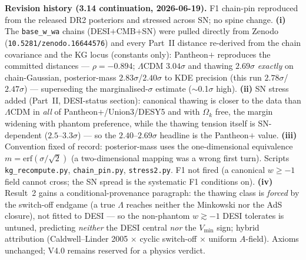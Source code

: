 \documentclass[11pt]{article}
\begin{document}
{\medskip
\noindent\textbf{Revision history (3.14 continuation, 2026-06-19).} F1 chain-pin reproduced from the released DR2 posteriors and stressed across SN; no spine change. \textbf{(i)} The \texttt{base\_w\_wa} chains (DESI$+$CMB$+$SN) were pulled directly from Zenodo (\texttt{10.5281/zenodo.16644576}) and every Part~II distance re-derived from the chain covariance and the KG locus (constants only): Pantheon$+$ reproduces the committed distances --- $\rho=-0.894$; $\Lambda$CDM $3.04\sigma$ and thawing $2.69\sigma$ \emph{exactly} on chain-Gaussian, posterior-mass $2.83\sigma$/$2.40\sigma$ to KDE precision (this run $2.78\sigma$/$2.47\sigma$) --- superseding the marginalised-$\sigma$ estimate ($\sim$0.1$\sigma$ high). \textbf{(ii)} SN stress added (Part~II, DESI-status section): canonical thawing is closer to the data than $\Lambda$CDM in \emph{all} of Pantheon$+$/Union3/DESY5 and with $\Omega_k$ free, the margin widening with phantom preference, while the thawing tension itself is SN-dependent ($2.5$--$3.3\sigma$) --- so the $2.40$--$2.69\sigma$ headline is the Pantheon$+$ value. \textbf{(iii)} Convention fixed of record: posterior-mass uses the one-dimensional equivalence $m=\mathrm{erf}(\sigma/\sqrt2)$ (a two-dimensional mapping was a wrong first turn). Scripts \texttt{kg\_recompute.py}, \texttt{chain\_pin.py}, \texttt{stress2.py}. F1 not fired (a canonical $w\ge-1$ field cannot cross; the SN spread is the systematic F1 conditions on). \textbf{(iv)} Result~2 gains a conditional-provenance paragraph: the thawing class is \emph{forced} by the switch-off endgame (a true $\Lambda$ reaches neither the Minkowski nor the AdS closure), not fitted to DESI --- so the non-phantom $w\gtrsim-1$ DESI tolerates is untuned, predicting \emph{neither} the DESI central \emph{nor} the $V_{\min}$ sign; hybrid attribution (Caldwell--Linder 2005 $\times$ cyclic switch-off $\times$ uniform $A$-field). Axioms unchanged; V4.0 remains reserved for a physics verdict.}
\end{document}
